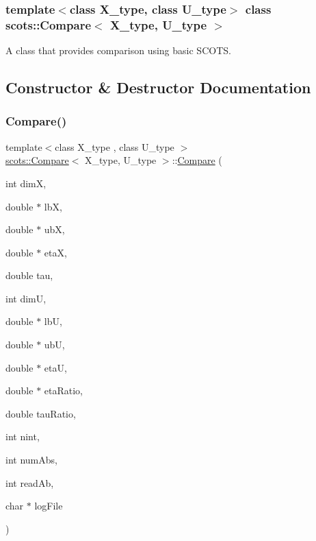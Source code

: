 \subsubsection*{template$<$class X\+\_\+type, class U\+\_\+type$>$\newline
class scots\+::\+Compare$<$ X\+\_\+type, U\+\_\+type $>$}

A class that provides comparison using basic S\+C\+O\+TS. 

\subsection{Constructor \& Destructor Documentation}
\mbox{\label{classscots_1_1Compare_a41fa2b26a7292b46edd3dfc7a6f8c5ee}} 
\subsubsection{\texorpdfstring{Compare()}{Compare()}}
{\footnotesize\ttfamily template$<$class X\+\_\+type , class U\+\_\+type $>$ \\
\hyperlink{classscots_1_1Compare}{scots\+::\+Compare}$<$ X\+\_\+type, U\+\_\+type $>$\+::\hyperlink{classscots_1_1Compare}{Compare} (\begin{DoxyParamCaption}\item[{int}]{dimX,  }\item[{double $\ast$}]{lbX,  }\item[{double $\ast$}]{ubX,  }\item[{double $\ast$}]{etaX,  }\item[{double}]{tau,  }\item[{int}]{dimU,  }\item[{double $\ast$}]{lbU,  }\item[{double $\ast$}]{ubU,  }\item[{double $\ast$}]{etaU,  }\item[{double $\ast$}]{eta\+Ratio,  }\item[{double}]{tau\+Ratio,  }\item[{int}]{nint,  }\item[{int}]{num\+Abs,  }\item[{int}]{read\+Ab,  }\item[{char $\ast$}]{log\+File }\end{DoxyParamCaption})\hspace{0.3cm}{\ttfamily [inline]}}

